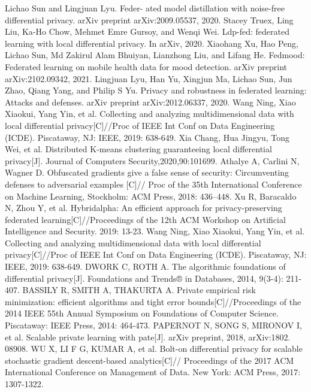 \documentclass[12pt,openany,a4paper,fancyhdr,oneside]{ctexbook}
\begin{document}
\begin{thebibliography}{99}
Lichao Sun and Lingjuan Lyu. Feder- ated model distillation with noise-free differential privacy. arXiv preprint arXiv:2009.05537, 2020.
Stacey Truex, Ling Liu, Ka-Ho Chow, Mehmet Emre Gursoy, and Wenqi Wei. Ldp-fed: federated learning with local differential privacy. In arXiv, 2020.
Xiaohang Xu, Hao Peng, Lichao Sun, Md Zakirul Alam Bhuiyan, Lianzhong Liu, and Lifang He. Fedmood: Federated learning on mobile health data for mood detection. arXiv preprint arXiv:2102.09342, 2021.
Lingjuan Lyu, Han Yu, Xingjun Ma, Lichao Sun, Jun Zhao, Qiang Yang, and Philip S Yu. Privacy and robustness in federated learning: Attacks and defenses. arXiv preprint arXiv:2012.06337, 2020.
Wang  Ning,  Xiao  Xiaokui,  Yang  Yin,  et  al.  Collecting  and  analyzing 
multidimensional data with local differential privacy[C]//Proc of IEEE Int 
Conf on Data Engineering (ICDE). Piscataway, NJ: IEEE, 2019: 638-649.
Xia  Chang,  Hua  Jingyu,  Tong  Wei,  et  al.  Distributed  K-means  clustering 
guaranteeing local differential privacy[J]. Journal of Computers Security,2020,90:101699.
Athalye A, Carlini N, Wagner D. Obfuscated gradients give a false sense of security: Circumventing defenses to adversarial examples [C]// Proc of the 35th International Conference on Machine Learning, Stockholm: ACM Press, 2018: 436–448.
Xu R, Baracaldo N, Zhou Y, et al. Hybridalpha: An efficient approach for privacy-preserving federated learning[C]//Proceedings of the 12th ACM Workshop on Artificial Intelligence and Security. 2019: 13-23.
Wang  Ning,  Xiao  Xiaokui,  Yang  Yin,  et  al.  Collecting  and  analyzing 
multidimensional data with local differential privacy[C]//Proc of IEEE Int 
Conf on Data Engineering (ICDE). Piscataway, NJ: IEEE, 2019: 638-649.
DWORK C, ROTH A. The algorithmic foundations of differential privacy[J]. Foundations and Trends® in Databases, 2014, 9(3-4): 211-407.
BASSILY R, SMITH A, THAKURTA A. Private empirical risk minimization: efficient algorithms and tight error bounds[C]//Proceedings of the 2014 IEEE 55th Annual Symposium on Foundations of Computer Science. Piscataway: IEEE Press, 2014: 464-473.
 PAPERNOT N, SONG S, MIRONOV I, et al. Scalable private learning with pate[J]. arXiv preprint, 2018, arXiv:1802. 08908.
WU X, LI F G, KUMAR A, et al. Bolt-on differential privacy for scalable stochastic gradient descent-based analytics[C]// Proceedings of the 2017 ACM International Conference on Management of Data. New York: ACM Press, 2017: 1307-1322.

\end{thebibliography}
\end{document}
